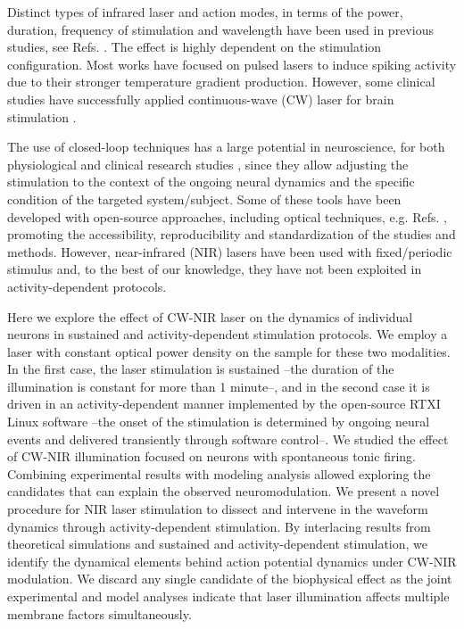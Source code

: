 Distinct types of infrared laser and action modes, in terms of the power, duration, frequency of stimulation and wavelength have been used in previous studies, see Refs. \cite{izzo_optical_2007, wells_application_2005,ping_targeted_2023}. The effect is highly dependent on the stimulation configuration. Most works have focused on pulsed lasers to induce spiking activity due to their stronger temperature gradient production. However, some clinical studies have successfully applied continuous-wave (CW) laser for brain stimulation \parencite{saucedo_transcranial_2021}.

The use of closed-loop techniques has a large potential in neuroscience, for both physiological and clinical research studies \parencite{potter_closedloop_2014, chamorro_generalization_2012, couto_firing_2015,lareo_temporal_2016,varona_online_2016,zrenner_closedloop_2016,linaro_realtime_2015,reyes-sanchez_automatized_2023}, since they allow adjusting the stimulation to the context of the ongoing neural dynamics and the specific condition of the targeted system/subject. Some of these tools have been developed with open-source approaches, including optical techniques, e.g. Refs. \parencite{siegle_neural_2015,dagnew_cerebralux_2017,amaducci_rthybrid_2019,stih_stytra_2019,robbins_optogenie_2021}, promoting the accessibility, reproducibility and standardization of the studies and methods. However, near-infrared (NIR) lasers have been used with fixed/periodic stimulus and, to the best of our knowledge, they have not been exploited in activity-dependent protocols. 

Here we explore the effect of CW-NIR laser on the dynamics of individual neurons in sustained and activity-dependent stimulation protocols. We employ a laser with constant optical power density on the sample for these two modalities. In the first case, the laser stimulation is sustained --the duration of the illumination is constant for more than 1 minute--, and in the second case it is driven in an activity-dependent manner implemented by the open-source RTXI\parencite{patel_hard_2017} Linux software --the onset of the stimulation is determined by ongoing neural events and delivered transiently through software control--.
We studied the effect of CW-NIR illumination focused on neurons with spontaneous tonic firing. Combining experimental results with modeling analysis allowed exploring the candidates that can explain the observed neuromodulation. We present a novel procedure for NIR laser stimulation to dissect and intervene in the waveform dynamics through activity-dependent stimulation. By interlacing results from theoretical simulations and sustained and activity-dependent stimulation, we identify the dynamical elements behind action potential dynamics under CW-NIR modulation. We discard any single candidate of the biophysical effect as the joint experimental and model analyses indicate that laser illumination affects multiple membrane factors simultaneously.
